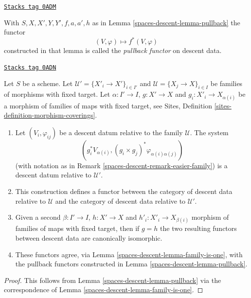 \begin{definition}
\label{spaces-descent-definition-pullback-functor}
\href{https://stacks.math.columbia.edu/tag/0ADM}{\texttt{Stacks tag 0ADM}}

With $S, X, X', Y, Y', f, a, a', h$ as in Lemma \ref{spaces-descent-lemma-pullback}
the functor
$$
(V, \varphi) \longmapsto f^*(V, \varphi)
$$
constructed in that lemma is called the {\it pullback functor} on descent data.
\end{definition}

\begin{lemma}
\label{spaces-descent-lemma-pullback-family}
\href{https://stacks.math.columbia.edu/tag/0ADN}{\texttt{Stacks tag 0ADN}}

Let $S$ be a scheme. Let $\mathcal{U}' = \{X'_i \to X'\}_{i \in I'}$ and
$\mathcal{U} = \{X_j \to X\}_{i \in I}$ be families of morphisms with
fixed target. Let $\alpha : I' \to I$, $g : X' \to X$ and
$g_i : X'_i \to X_{\alpha(i)}$ be a morphism of families
of maps with fixed target, see
Sites, Definition \ref{sites-definition-morphism-coverings}.
\begin{enumerate}
\item Let $(V_i, \varphi_{ij})$ be a descent datum relative to the
family $\mathcal{U}$. The system
$$
\left(
g_i^*V_{\alpha(i)}, (g_i \times g_j)^*\varphi_{\alpha(i) \alpha(j)}
\right)
$$
(with notation as in Remark \ref{spaces-descent-remark-easier-family})
is a descent datum relative to $\mathcal{U}'$.
\item This construction defines a functor between the category of
descent data relative to $\mathcal{U}$ and the category of
descent data relative to $\mathcal{U}'$.
\item Given a second $\beta : I' \to I$, $h : X' \to X$ and
$h'_i : X'_i \to X_{\beta(i)}$ morphism of families
of maps with fixed target, then if $g = h$ the two resulting functors
between descent data are canonically isomorphic.
\item These functors agree, via Lemma \ref{spaces-descent-lemma-family-is-one},
with the pullback functors constructed in Lemma \ref{spaces-descent-lemma-pullback}.
\end{enumerate}
\end{lemma}

\begin{proof}
This follows from Lemma \ref{spaces-descent-lemma-pullback} via the
correspondence of Lemma \ref{spaces-descent-lemma-family-is-one}.
\end{proof}


